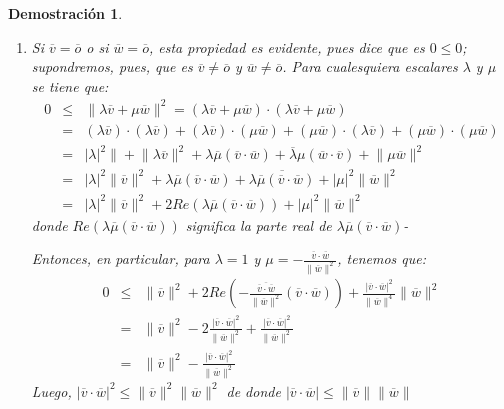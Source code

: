 \documentclass[a4paper,11pt]{article}
\theoremstyle{teoremas}
\theoremstyle{ejemplos}
\theoremstyle{definiciones}
\theoremstyle{lemas}
\newtheorem*{demostracion}{Demostraci\'on}
\begin{document}
\begin{demostracion}
\begin{enumerate}
  \item Si $\overline{v} = \overline{o}$ o si $\overline{w} = \overline{o}$, esta propiedad es evidente, pues dice que es $0 \leq 0$;
  supondremos, pues, que es $\overline{v} \neq \overline{o}$ y $\overline{w} \neq \overline{o}$.
  Para cualesquiera escalares $\lambda$ y $\mu$ se tiene que:
  \begin{eqnarray*}
   0 & \leq & \lVert \lambda\overline{v} + \mu\overline{w} \rVert^2 = \left( \lambda\overline{v} + \mu\overline{w} \right) \cdot \left( \lambda\overline{v} + \mu\overline{w} \right) \\ 
     & = & \left( \lambda\overline{v} \right) \cdot \left(\lambda\overline{v}\right) + \left( \lambda\overline{v}\right)\cdot\left(\mu\overline{w}\right) + \left(\mu\overline{w}\right) \cdot \left(\lambda\overline{v}\right) + \left(\mu\overline{w} \right)\cdot \left(\mu\overline{w}\right) \\ 
     & = & \lvert\lambda\rvert^2\rVert + \lVert \lambda\overline{v} \rVert^2 + \lambda\overline{\mu}\left( \overline{v} \cdot \overline{w} \right) + \overline{\lambda}\mu\left( \overline{w}\cdot \overline{v} \right) + \lVert \mu\overline{w} \rVert^2 \\
     & = & \lvert \lambda \rvert^2 \lVert\overline{v}\rVert^2 + \lambda \overline{\mu} \left( \overline{v}\cdot \overline{w} \right) + \overline{\lambda\overline{\mu}\left( \overline{v}\cdot\overline{w} \right)} + \lvert \mu \rvert^2 \lVert\overline{w}\rVert^2 \\
     & = & \lvert \lambda \rvert^2 \lVert\overline{v}\rVert^2 + 2Re\left(  \lambda \overline{\mu} \left( \overline{v}\cdot \overline{w} \right) \right) + \lvert \mu \rvert^2 \lVert\overline{w}\rVert^2
  \end{eqnarray*}
  donde $Re\left(  \lambda \overline{\mu} \left( \overline{v}\cdot \overline{w} \right) \right)$ significa la parte real de $\lambda \overline{\mu} \left( \overline{v}\cdot \overline{w} \right)$-
  \par 
  Entonces, en particular, para $\lambda = 1$ y $\mu = -\frac{\overline{v}\cdot\overline{w}}{\lVert \overline{w} \rVert^2} $, tenemos que:
  \begin{eqnarray*}
   0 & \leq & \lVert \overline{v} \rVert^2 + 2Re \left( -\frac{\overline{\overline{v}\cdot \overline{w}}}{\lVert \overline{w} \rVert^2} \left( \overline{v}\cdot \overline{w} \right)  \right) + \frac{\lvert \overline{v}\cdot \overline{w} \rvert^2}{\lVert \overline{w} \rVert^4} \lVert \overline{w} \rVert^2 \\
     & = & \lVert \overline{v} \rVert^2 - 2\frac{\lvert \overline{v} \cdot \overline{w} \rvert^2}{\lVert \overline{w} \rVert^2} + \frac{\lvert \overline{v} \cdot \overline{w} \rvert^2}{\lVert \overline{w} \rVert^2} \\
     & = & \lVert \overline{v} \rVert^2 - \frac{\lvert \overline{v} \cdot \overline{w} \rvert^2}{\lVert \overline{w} \rVert^2}
  \end{eqnarray*}
  Luego, $\lvert \overline{v}\cdot \overline{w} \rvert^2 \leq \lVert \overline{v} \rVert^2 \lVert \overline{w} \rVert^2$ de donde $\lvert \overline{v} \cdot \overline{w} \rvert \leq \lVert \overline{v} \rVert \lVert \overline{w} \rVert$


\end{enumerate}
\end{demostracion}
\end{document}
